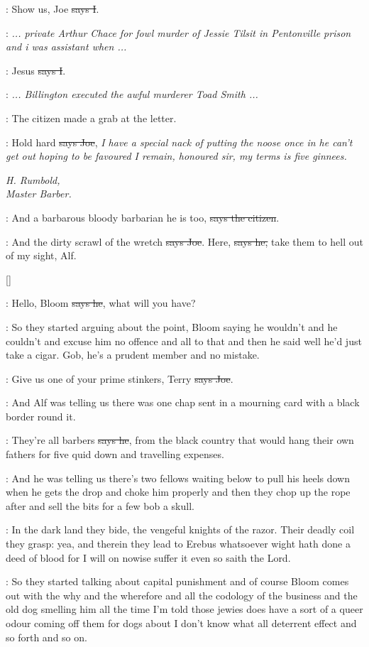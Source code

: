 :
Show us, Joe \sout{says I}.

\joe:
\emph{... private Arthur Chace for fowl murder of Jessie Tilsit in
Pentonville prison and i was assistant when ...}

:
Jesus \sout{says I}.

\joe:
\emph{... Billington executed the awful murderer Toad Smith ...}

\Nq:
The citizen made a grab at the letter.

\joe:
Hold hard \sout{says Joe},
\emph{I have a special nack of putting the noose once in
he can't get out hoping to be favoured I remain, honoured sir, my terms is
five ginnees.}

\emph{%
H. Rumbold, \\
Master Barber.}

\citizen:
And a barbarous bloody barbarian he is too,
\sout{says the citizen}.

\joe:
And the dirty scrawl of the wretch \sout{says Joe}.
Here, \sout{says he,} take them
to hell out of my sight, Alf.

[]

\joe:
Hello, Bloom \sout{says he}, what will you have?

\Nq:
So they started arguing about the point, Bloom saying he wouldn't
and he couldn't and excuse him no offence and all to that and then he said
well he'd just take a cigar. Gob, he's a prudent member and no mistake.

\joe:
Give us one of your prime stinkers,
Terry \sout{says Joe}.

\Nq:
And Alf was telling us there was one chap sent in a mourning card
with a black border
round it.

\bergan:
They're all barbers \sout{says he},
from the black country that would hang
their own fathers for five quid down and travelling expenses.

\Nq:
And he was telling us there's two fellows waiting below to pull his
heels down when he gets the drop and choke him properly and then they
chop up the rope after and sell the bits for a few bob a skull.

:
In the dark land they bide, the vengeful knights of the razor. Their
deadly coil they grasp: yea, and therein they lead to Erebus whatsoever
wight hath done a deed of blood for I will on nowise suffer it even so
saith the Lord.

\Nq:
So they started talking about capital punishment
and of course Bloom
comes out with the why and the wherefore and all the codology of the
business and the old dog smelling him all the time I'm told those jewies
does have a sort of a queer odour coming off them for dogs about I don't
know what all deterrent effect and so forth and so on.

